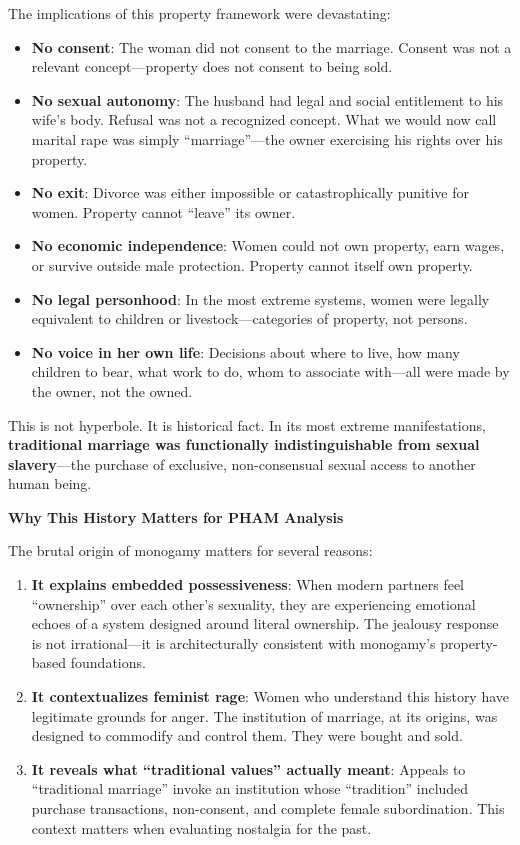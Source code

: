 \documentclass[12pt,openany]{book}
\numberwithin{equation}{chapter}
\begin{document}
The implications of this property framework were devastating:

\begin{itemize}
    \item \textbf{No consent}: The woman did not consent to the marriage. Consent was not a relevant concept---property does not consent to being sold.
    \item \textbf{No sexual autonomy}: The husband had legal and social entitlement to his wife's body. Refusal was not a recognized concept. What we would now call marital rape was simply ``marriage''---the owner exercising his rights over his property.
    \item \textbf{No exit}: Divorce was either impossible or catastrophically punitive for women. Property cannot ``leave'' its owner.
    \item \textbf{No economic independence}: Women could not own property, earn wages, or survive outside male protection. Property cannot itself own property.
    \item \textbf{No legal personhood}: In the most extreme systems, women were legally equivalent to children or livestock---categories of property, not persons.
    \item \textbf{No voice in her own life}: Decisions about where to live, how many children to bear, what work to do, whom to associate with---all were made by the owner, not the owned.
\end{itemize}

This is not hyperbole. It is historical fact. In its most extreme manifestations, \textbf{traditional marriage was functionally indistinguishable from sexual slavery}---the purchase of exclusive, non-consensual sexual access to another human being.

\textbf{Why This History Matters for PHAM Analysis}

The brutal origin of monogamy matters for several reasons:

\begin{enumerate}
    \item \textbf{It explains embedded possessiveness}: When modern partners feel ``ownership'' over each other's sexuality, they are experiencing emotional echoes of a system designed around literal ownership. The jealousy response is not irrational---it is architecturally consistent with monogamy's property-based foundations.
    
    \item \textbf{It contextualizes feminist rage}: Women who understand this history have legitimate grounds for anger. The institution of marriage, at its origins, was designed to commodify and control them. They were bought and sold.
    
    \item \textbf{It reveals what ``traditional values'' actually meant}: Appeals to ``traditional marriage'' invoke an institution whose ``tradition'' included purchase transactions, non-consent, and complete female subordination. This context matters when evaluating nostalgia for the past.
\end{enumerate}
\end{document}
